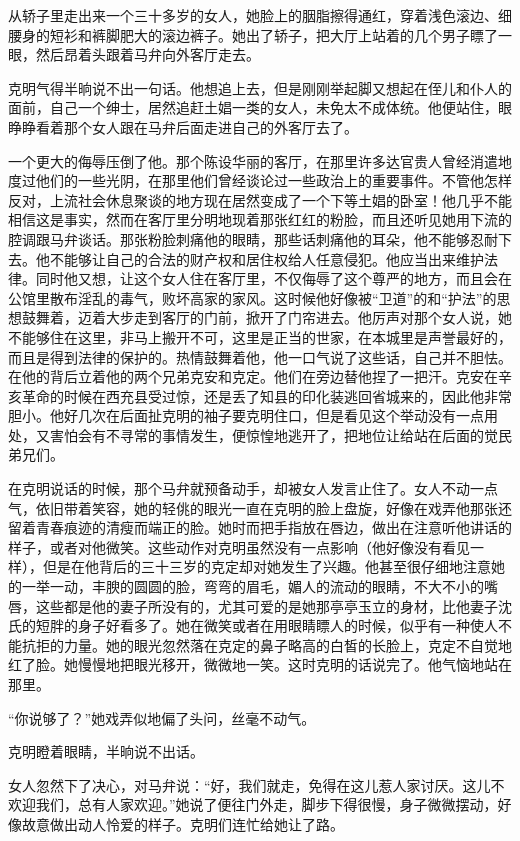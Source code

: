 \par 从轿子里走出来一个三十多岁的女人，她脸上的胭脂擦得通红，穿着浅色滚边、细腰身的短衫和裤脚肥大的滚边裤子。她出了轿子，把大厅上站着的几个男子瞟了一眼，然后昂着头跟着马弁向外客厅走去。
\par 克明气得半晌说不出一句话。他想追上去，但是刚刚举起脚又想起在侄儿和仆人的面前，自己一个绅士，居然追赶土娼一类的女人，未免太不成体统。他便站住，眼睁睁看着那个女人跟在马弁后面走进自己的外客厅去了。
\par 一个更大的侮辱压倒了他。那个陈设华丽的客厅，在那里许多达官贵人曾经消遣地度过他们的一些光阴，在那里他们曾经谈论过一些政治上的重要事件。不管他怎样反对，上流社会休息聚谈的地方现在居然变成了一个下等土娼的卧室！他几乎不能相信这是事实，然而在客厅里分明地现着那张红红的粉脸，而且还听见她用下流的腔调跟马弁谈话。那张粉脸刺痛他的眼睛，那些话刺痛他的耳朵，他不能够忍耐下去。他不能够让自己的合法的财产权和居住权给人任意侵犯。他应当出来维护法律。同时他又想，让这个女人住在客厅里，不仅侮辱了这个尊严的地方，而且会在公馆里散布淫乱的毒气，败坏高家的家风。这时候他好像被“卫道”的和“护法”的思想鼓舞着，迈着大步走到客厅的门前，掀开了门帘进去。他厉声对那个女人说，她不能够住在这里，非马上搬开不可，这里是正当的世家，在本城里是声誉最好的，而且是得到法律的保护的。热情鼓舞着他，他一口气说了这些话，自己并不胆怯。在他的背后立着他的两个兄弟克安和克定。他们在旁边替他捏了一把汗。克安在辛亥革命的时候在西充县受过惊，还是丢了知县的印化装逃回省城来的，因此他非常胆小。他好几次在后面扯克明的袖子要克明住口，但是看见这个举动没有一点用处，又害怕会有不寻常的事情发生，便惊惶地逃开了，把地位让给站在后面的觉民弟兄们。
\par 在克明说话的时候，那个马弁就预备动手，却被女人发言止住了。女人不动一点气，依旧带着笑容，她的轻佻的眼光一直在克明的脸上盘旋，好像在戏弄他那张还留着青春痕迹的清瘦而端正的脸。她时而把手指放在唇边，做出在注意听他讲话的样子，或者对他微笑。这些动作对克明虽然没有一点影响（他好像没有看见一样），但是在他背后的三十三岁的克定却对她发生了兴趣。他甚至很仔细地注意她的一举一动，丰腴的圆圆的脸，弯弯的眉毛，媚人的流动的眼睛，不大不小的嘴唇，这些都是他的妻子所没有的，尤其可爱的是她那亭亭玉立的身材，比他妻子沈氏的短胖的身子好看多了。她在微笑或者在用眼睛瞟人的时候，似乎有一种使人不能抗拒的力量。她的眼光忽然落在克定的鼻子略高的白皙的长脸上，克定不自觉地红了脸。她慢慢地把眼光移开，微微地一笑。这时克明的话说完了。他气恼地站在那里。
\par “你说够了？”她戏弄似地偏了头问，丝毫不动气。
\par 克明瞪着眼睛，半晌说不出话。
\par 女人忽然下了决心，对马弁说：“好，我们就走，免得在这儿惹人家讨厌。这儿不欢迎我们，总有人家欢迎。”她说了便往门外走，脚步下得很慢，身子微微摆动，好像故意做出动人怜爱的样子。克明们连忙给她让了路。

